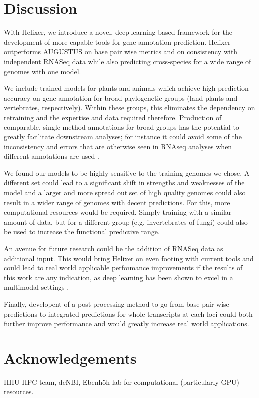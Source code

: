 \documentclass{bioinfo}
\begin{document}
\section{Discussion}
With Helixer, we introduce a novel, deep-learning based framework for the development 
of more capable tools for gene annotation prediction. 
Helixer outperforms AUGUSTUS on base pair wise metrics and on 
consistency with independent RNASeq data while also predicting cross-species for a wide range of  
genomes with one model. 

We include trained models for plants and animals which achieve 
high prediction accuracy on gene annotation for broad 
phylogenetic groups (land plants and vertebrates, respectively).
Within these groups, this eliminates the dependency on retraining and the
expertise and data required therefore. Production of comparable, single-method
annotations for broad groups has the potential to greatly facilitate downstream
analyses; for instance it could avoid some of the inconsistency and errors that
are otherwise seen in RNAseq analyses when different annotations are used 
\citep{zhao2015comprehensive,torres2016robust}.

We found our models to be highly sensitive to the training genomes we chose. A 
different set could lead to a significant shift in strengths and weaknesses of the 
model and a larger and more spread out set of high quality genomes could also result 
in a wider range of genomes with decent predictions. For this, more computational 
resources would be required. Simply training with a similar amount of data, 
but for a different group (e.g. invertebrates of fungi) could also be used to 
increase the functional predictive range. 

An avenue for future research could be the addition of RNASeq data as additional 
input. This would bring Helixer on even footing with current tools and could lead 
to real world applicable performance improvements if the results of this work are 
any indication, as deep learning has been shown to excel in a multimodal settings 
\citep{ching2018opportunities}.

Finally, developent of a post-processing method
to go from base pair wise predictions to integrated predictions for whole 
transcripts at each loci could both further improve performance and would
greatly increase real world applications.

\section*{Acknowledgements}
HHU HPC-team, deNBI, Ebenh{\"o}h lab for computational (particularly GPU) resources.
\end{document}
